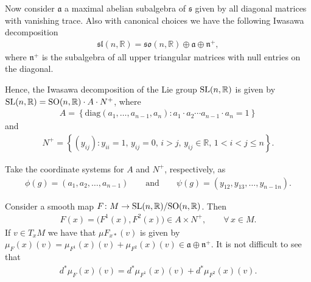 \documentclass[10pt,a4paper]{amsart}
\numberwithin{equation}{section}
\begin{document}
Now consider ${\mathfrak a}$ a maximal abelian subalgebra of ${\mathfrak s}$ given by all diagonal matrices  with va\-nishing trace. Also with canonical choices we have the following Iwasawa decomposition
\begin{gather*}
  {\mathfrak{sl}}(n, {\mathbb R})= {\mathfrak{so}}(n,{\mathbb R}) \oplus {\mathfrak a} \oplus {\mathfrak n}^{+} ,
\end{gather*}
where ${\mathfrak n}^{+}$ is the subalgebra of all upper triangular matrices with null entries on the diagonal.

Hence, the Iwasawa decomposition of the Lie group ${\rm SL}(n,\mathbb{R})$ is given by ${\rm SL}(n,\mathbb{R})= {\rm SO}(n,\mathbb{R})  \cdot A \cdot N^{+}$, where
\begin{gather*}
  A = \left\{ \textrm{diag}(a_1, \ldots, a_{n-1},a_n)
\colon a_1\cdot a_2\cdots   a_{n-1}\cdot a_n = 1
  \right\}
\end{gather*}
and
\begin{gather*}
  N^{+} = \left\{(y_{ij})\colon  y_{ii}=1, \, y_{ij} = 0,\, i>j, \, y_{ij} \in {\mathbb R}, \, 1<i<j\leq n
  \right\} .
\end{gather*}

Take the coordinate systems for $A$ and $N^{+}$, respectively, as
\begin{gather}\label{coordi}
  \phi(g) = (a_1,a_2,\ldots,a_{n-1}) \qquad \textrm{and} \qquad \psi(g) = (y_{12},y_{13}, \ldots,y_{n-1n}).
\end{gather}

Consider a smooth map $F\colon M \rightarrow {\rm SL}(n,\mathbb{R})/{\rm SO}(n,\mathbb{R})$. Then
\begin{gather*}
  F(x) = \big(F^1(x),F^2(x)\big) \in  A\times N^{+},\qquad \forall\, x \in M.
\end{gather*}
If $ v \in T_xM$ we have that $ \mu F_{x*}(v)$ is given by $\mu_{F}(x)(v)= \mu_{F^1}(x)(v) + \mu_{F^2}(x)(v) \in \mathfrak{a} \oplus \mathfrak{n}^{+}$. It is not dif\/f\/icult to see that
\begin{gather*}
  d^*\mu_{F}(x)(v)  = d^*\mu_{F^1}(x)(v) + d^*\mu_{F^2}(x)(v).
\end{gather*}
\end{document}
